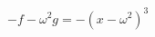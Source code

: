 \documentclass[preview]{standalone}
\begin{document}
\begin{center}
$-f-\omega^2 g=-(x-\omega^2)^3$
\end{center}
\end{document}
